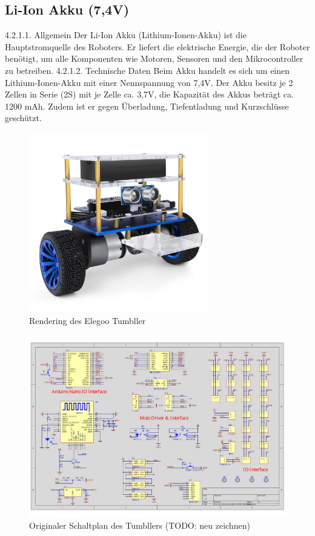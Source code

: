 \subsection{Li-Ion Akku (7,4V)}
%
4.2.1.1. Allgemein
Der Li-Ion Akku (Lithium-Ionen-Akku) ist die Hauptstromquelle des Roboters. Er liefert die elektrische Energie, die der Roboter benötigt, um alle Komponenten wie Motoren, Sensoren und den Mikrocontroller zu betreiben.
4.2.1.2. Technische Daten
Beim Akku handelt es sich um einen Lithium-Ionen-Akku mit einer Nennspannung von 7,4V. Der Akku besitz je 2 Zellen in Serie (2S) mit je Zelle ca. 3,7V, die Kapazität des Akkus beträgt ca. 1200 mAh. Zudem ist er gegen Überladung, Tiefentladung und Kurzschlüsse geschützt. 
%
\begin{figure}[H]
    \includegraphics[width=0.7\textwidth, center]{img/elegoo_tumbller.png}
    \caption{Rendering des Elegoo Tumbller}
    \label{fig:elegoo_tumbller}
\end{figure}
\begin{figure}
    \includegraphics[width=\textwidth, center]{img/elegoo_tumbller_original_circuit.pdf}
    \caption{Originaler Schaltplan des Tumbllers (TODO: neu zeichnen)}
    \label{fig:elegoo_tumbller_original_circuit}
\end{figure}

